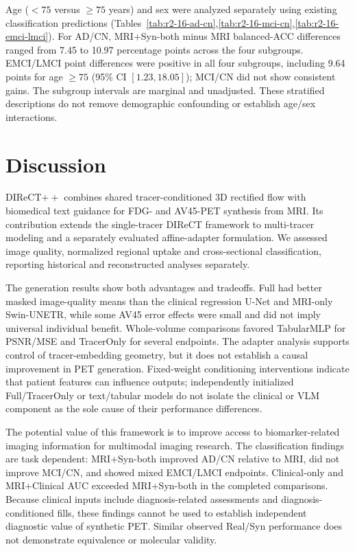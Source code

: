 \documentclass{article}
\begin{document}
Age ($<75$ versus $\geq75$ years) and sex were analyzed separately using existing classification predictions (Tables~\ref{tab:r2-16-ad-cn},\ref{tab:r2-16-mci-cn},\ref{tab:r2-16-emci-lmci}). For AD/CN, MRI+Syn-both minus MRI balanced-ACC differences ranged from 7.45 to 10.97 percentage points across the four subgroups. EMCI/LMCI point differences were positive in all four subgroups, including 9.64 points for age $\geq75$ (95\% CI $[1.23,18.05]$); MCI/CN did not show consistent gains. The subgroup intervals are marginal and unadjusted. These stratified descriptions do not remove demographic confounding or establish age/sex interactions.



\section{Discussion}
DIReCT$++$ combines shared tracer-conditioned 3D rectified flow with biomedical text guidance for FDG- and AV45-PET synthesis from MRI. Its contribution extends the single-tracer DIReCT framework to multi-tracer modeling and a separately evaluated affine-adapter formulation. We assessed image quality, normalized regional uptake and cross-sectional classification, reporting historical and reconstructed analyses separately.

The generation results show both advantages and tradeoffs. Full had better masked image-quality means than the clinical regression U-Net and MRI-only Swin-UNETR, while some AV45 error effects were small and did not imply universal individual benefit. Whole-volume comparisons favored TabularMLP for PSNR/MSE and TracerOnly for several endpoints. The adapter analysis supports control of tracer-embedding geometry, but it does not establish a causal improvement in PET generation. Fixed-weight conditioning interventions indicate that patient features can influence outputs; independently initialized Full/TracerOnly or text/tabular models do not isolate the clinical or VLM component as the sole cause of their performance differences.

The potential value of this framework is to improve access to biomarker-related imaging information for multimodal imaging research. The classification findings are task dependent: MRI+Syn-both improved AD/CN relative to MRI, did not improve MCI/CN, and showed mixed EMCI/LMCI endpoints. Clinical-only and MRI+Clinical AUC exceeded MRI+Syn-both in the completed comparisons. Because clinical inputs include diagnosis-related assessments and diagnosis-conditioned fills, these findings cannot be used to establish independent diagnostic value of synthetic PET. Similar observed Real/Syn performance does not demonstrate equivalence or molecular validity.
\end{document}
